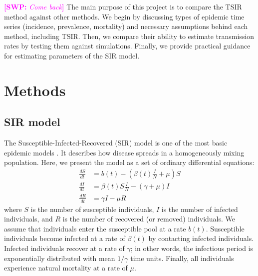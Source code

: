 \documentclass{article}
\newcommand{\comment}[3]{\textcolor{#1}{\textbf{[#2: }\textsl{#3}\textbf{]}}}
\newcommand{\swp}[1]{\comment{magenta}{SWP}{#1}}
\begin{document}
\swp{Come back}
The main purpose of this project is to compare the TSIR method against other methods.
We begin by discussing types of epidemic time series (incidence, prevalence, mortality) and necessary assumptions behind each method, including TSIR.
Then, we compare their ability to estimate transmission rates by testing them against simulations.
Finally, we provide practical guidance for estimating parameters of the SIR model.

\section{Methods}

\subsection{SIR model}

The Susceptible-Infected-Recovered (SIR) model is one of the most basic epidemic models \citep{kermack1927contribution}.
It describes how disease spreads in a homogeneously mixing population.
Here, we present the model as a set of ordinary differential equations:
\begin{equation}\label{eq:sir}
\begin{aligned}
\frac{dS}{dt} &= b(t) - \left(\beta(t) \frac{I}{N} + \mu \right) S\\
\frac{dI}{dt} &= \beta(t) S \frac{I}{N} - (\gamma + \mu) I\\
\frac{dR}{dt} &= \gamma I - \mu R
\end{aligned}
\end{equation}
where $S$ is the number of susceptible individuals, $I$ is the number of infected individuals, and $R$ is the number of recovered (or removed) individuals.
We assume that individuals enter the susceptible pool at a rate $b(t)$.
Susceptible individuals become infected at a rate of $\beta(t)$ by contacting infected individuals.
Infected individuals recover at a rate of $\gamma$;
in other words, the infectious period is exponentially distributed with mean $1/\gamma$ time units.
Finally, all individuals experience natural mortality at a rate of $\mu$.
\end{document}
